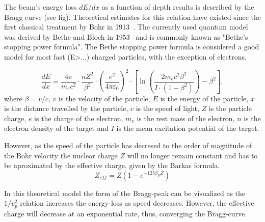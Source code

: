 The beam's energy loss $dE/dx$ as a function of depth results is described by the Bragg curve (see fig). %
 Theoretical estimates for this relation have existed since the first classical treatment by Bohr in 1913~\cite{bohr13}. The currently used quantum model was derived by Bethe and Bloch in 1953~\cite{bethebloch53}  and is commonly known as "Bethe's stopping power formula". The Bethe stopping power formula is considered a good model for most fast (E>...) %
charged particles, with the exception of electrons.

\begin{equation}
 \frac{dE}{dx} = \frac{4 \pi}{m_e c^2} \cdot \frac{nZ^2}{\beta^2} \cdot \left(\frac{e^2}{4\pi\varepsilon_0}\right)^2 \cdot \left[\ln \left(\frac{2m_e c^2 \beta^2}{I \cdot (1-\beta^2)}\right) - \beta^2\right],
\label{bethebloch}
\end{equation}
where $\beta = v/c $, 
$v$ is the velocity of the particle,
$E$ is the 
energy of the particle,
$x$ is the 
distance travelled by the particle,
$c$ is the 
speed of light,
$Z$ is the 
particle charge,
$e$ is the 
charge of the electron,
$m_e$ is the 
rest mass of the electron,
$n$ is the 
electron density of the target and 
$I$  is the 
mean excitation potential of the target.


However, as the speed of the particle has decresed to the order of magnitude of the Bohr velocity the nuclear charge $Z$ will no longer remain constant and has to be aproximated by the effective charge, given by the Barkas formula. $$Z_{eff} = Z(1-e^{-125\beta_{P}Z})$$

In this theoretical model the form of the Bragg-peak can be visualized as the $1/v_{p}^2$ relation increases the energy-loss as speed decreases. However, the effective charge will decrease at an exponential rate, thus, converging the Bragg-curve.

